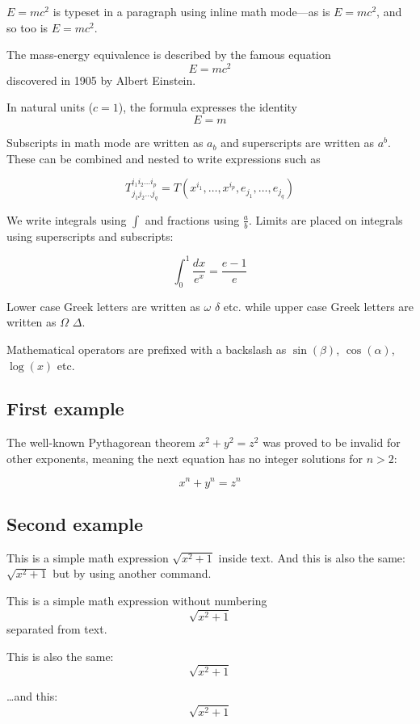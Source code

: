 \documentclass[12pt, letterpaper]{article}
\begin{document}
    \begin{math}
        E=mc^2
    \end{math} is typeset in a paragraph using inline math mode---as is $E=mc^2$, and so too is \(E=mc^2\).

    The mass-energy equivalence is described by the famous equation\[ E=mc^2 \] discovered in 1905 by Albert Einstein.

    In natural units ($c = 1$), the formula expresses the identity
    \begin{equation}
        E=m
    \end{equation}

    Subscripts in math mode are written as $a_b$ and superscripts are written as $a^b$.
    These can be combined and nested to write expressions such as

    \[ T^{i_1 i_2 \dots i_p}_{j_1 j_2 \dots j_q} = T(x^{i_1},\dots,x^{i_p},e_{j_1},\dots,e_{j_q}) \]

    We write integrals using $\int$ and fractions using $\frac{a}{b}$.
    Limits are placed on integrals using superscripts and subscripts:

    \[ \int_0^1 \frac{dx}{e^x} =  \frac{e-1}{e} \]

    Lower case Greek letters are written as $\omega$ $\delta$ etc.
    while upper case Greek letters are written as $\Omega$ $\Delta$.

    Mathematical operators are prefixed with a backslash as $\sin(\beta)$, $\cos(\alpha)$, $\log(x)$ etc.

    \subsection{First example}\label{subsec:first-example}

    The well-known Pythagorean theorem \(x^2 + y^2 = z^2\) was proved to be invalid for other exponents, meaning the next equation has no integer solutions for \(n>2\):

    \[ x^n + y^n = z^n \]

    \subsection{Second example}\label{subsec:second-example}

    This is a simple math expression \(\sqrt{x^2+1}\) inside text.
    And this is also the same:
    \begin{math}
        \sqrt{x^2+1}
    \end{math}
    but by using another command.

    This is a simple math expression without numbering
    \[\sqrt{x^2+1}\]
    separated from text.

    This is also the same:
    \begin{displaymath}
        \sqrt{x^2+1}
    \end{displaymath}

    \ldots and this:
    \begin{equation*}
        \sqrt{x^2+1}
    \end{equation*}
\end{document}

